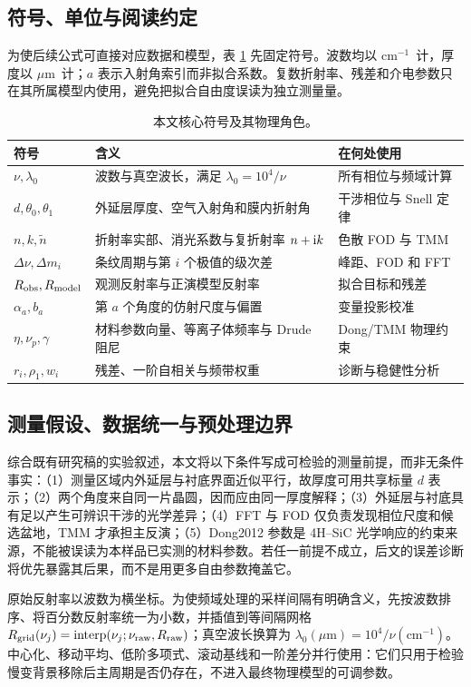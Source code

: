 \documentclass[10pt,a4paper]{ctexart}
\newcommand{\um}{\ensuremath{\mu\mathrm{m}}}
\newcommand{\wn}{\ensuremath{\mathrm{cm}^{-1}}}
\begin{document}
\subsection*{符号、单位与阅读约定}
为使后续公式可直接对应数据和模型，表 \ref{tab:symbols-cn} 先固定符号。波数均以 \wn\ 计，厚度以 \um\ 计；$a$ 表示入射角索引而非拟合系数。复数折射率、残差和介电参数只在其所属模型内使用，避免把拟合自由度误读为独立测量量。
\begin{table}[H]\centering\small
\caption{本文核心符号及其物理角色。}\label{tab:symbols-cn}
\begin{tabular}{p{.18\linewidth}p{.42\linewidth}p{.26\linewidth}}\toprule
符号 & 含义 & 在何处使用\\\midrule
$\nu,\lambda_0$ & 波数与真空波长，满足 $\lambda_0=10^4/\nu$ & 所有相位与频域计算\\
$d,\theta_0,\theta_1$ & 外延层厚度、空气入射角和膜内折射角 & 干涉相位与 Snell 定律\\
$n,k,\tilde n$ & 折射率实部、消光系数与复折射率 $n+{\rm i}k$ & 色散 FOD 与 TMM\\
$\Delta\nu,\Delta m_i$ & 条纹周期与第 $i$ 个极值的级次差 & 峰距、FOD 和 FFT\\
$R_{\rm obs},R_{\rm model}$ & 观测反射率与正演模型反射率 & 拟合目标和残差\\
$\alpha_a,b_a$ & 第 $a$ 个角度的仿射尺度与偏置 & 变量投影校准\\
$\eta,\nu_p,\gamma$ & 材料参数向量、等离子体频率与 Drude 阻尼 & Dong/TMM 物理约束\\
$r_i,\rho_1,w_i$ & 残差、一阶自相关与频带权重 & 诊断与稳健性分析\\\bottomrule
\end{tabular}
\end{table}

\subsection*{测量假设、数据统一与预处理边界}
综合既有研究稿的实验叙述，本文将以下条件写成可检验的测量前提，而非无条件事实：（1）测量区域内外延层与衬底界面近似平行，故厚度可用共享标量 $d$ 表示；（2）两个角度来自同一片晶圆，因而应由同一厚度解释；（3）外延层与衬底具有足以产生可辨识干涉的光学差异；（4）FFT 与 FOD 仅负责发现相位尺度和候选盆地，TMM 才承担主反演；（5）Dong2012 参数是 4H--SiC 光学响应的约束来源，不能被误读为本样品已实测的材料参数。若任一前提不成立，后文的误差诊断将优先暴露其后果，而不是用更多自由参数掩盖它。

原始反射率以波数为横坐标。为使频域处理的采样间隔有明确含义，先按波数排序、将百分数反射率统一为小数，并插值到等间隔网格 $R_{\rm grid}(\nu_j)=\operatorname{interp}(\nu_j;\nu_{\rm raw},R_{\rm raw})$；真空波长换算为 $\lambda_0(\um)=10^4/\nu(\wn)$。中心化、移动平均、低阶多项式、滚动基线和一阶差分并行使用：它们只用于检验慢变背景移除后主周期是否仍存在，不进入最终物理模型的可调参数。
\end{document}
